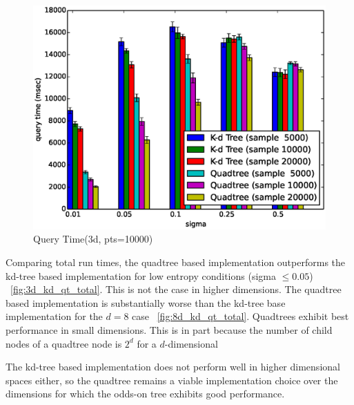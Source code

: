 \documentclass[mcs]{scsthesis}
\begin{document}
\begin{figure}
\begin{center}
\includegraphics[scale=0.5]{diagrams/3d_qt_kt_pts10000_qtime.eps}
\caption{Query Time(3d, pts=10000)}
\label{fig:3d_kd_qt_qtime}
\end{center}
\end{figure}

Comparing total run times, the quadtree based implementation outperforms the
kd-tree based implementation for low entropy conditions (sigma \(\le 0.05\))
~\ref{fig:3d_kd_qt_total}. This is not the case in higher dimensions.
The quadtree based implementation is substantially worse than the kd-tree
base implementation for the \(d = 8\) case ~\ref{fig:8d_kd_qt_total}.  Quadtrees
exhibit best performance in small dimensions. This is in part because
the number of child nodes of a quadtree node is \(2^d\) for a \(d\)-dimensional

The kd-tree based implementation does not perform well in higher dimensional
spaces either, so the quadtree remains a viable implementation choice over the
dimensions for which the odds-on tree exhibits good performance.
\end{document}
